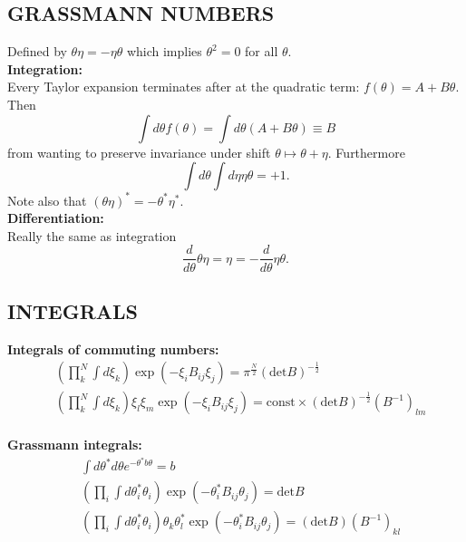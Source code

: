 \documentclass[a4paper, norsk, 8pt, landscape]{article}
\newcommand{\EQU}[1] { \begin{equation*} \begin{split}
#1
\end{split} \end{equation*} }
\begin{document}
\begin{multicols*}{3}
\subsection*{\small  GRASSMANN NUMBERS}
Defined by $\theta \eta = -\eta \theta$ which implies $\theta^2=0$ for all $\theta$. \\
 {\textbf{Integration:}}\\
Every Taylor expansion terminates after at the quadratic term: $f(\theta)=A+B\theta$. Then
\[
\int d\theta f(\theta) = \int d\theta (A+B\theta) \equiv B
\]
from wanting to preserve invariance under shift $\theta \mapsto \theta + \eta$.
Furthermore
\[
\int d\theta \int d\eta \eta \theta = +1.
\]
Note also that $(\theta \eta)^* = -\theta^* \eta^*$.
\\
 {\textbf{Differentiation:}}\\
Really the same as integration
\[
\frac{d}{d\theta}\theta \eta = \eta = -\frac{d}{d\theta}\eta\theta.
\]














\subsection*{\small  INTEGRALS}
 {\textbf{Integrals of commuting numbers:}}
\EQU{
& \left(\prod_k^N \int d\xi_k\right)\exp \left(-\xi_i B_{ij} \xi_j \right)
= \pi^{\frac{N}{2}}(\text{det} B)^{-\frac{1}{2}} \\
& \left(\prod_k^N \int d\xi_k\right)\xi_l \xi_m \exp \left(-\xi_i B_{ij} \xi_j \right)
= \text{const}\times (\text{det} B)^{-\frac{1}{2}} (B^{-1})_{lm}
}
\\
 {\textbf{Grassmann integrals:}}
\EQU{
& \int d \theta^* d\theta e^{-\theta^* b \theta} = b \\
& \left(\prod_i \int d\theta^*_i \theta_i\right) \exp \left(-\theta^*_i B_{ij}\theta_j\right)
= \text{det} B \\
& \left(\prod_i \int d\theta^*_i \theta_i\right)\theta_k \theta^*_l \exp \left(-\theta^*_i B_{ij}\theta_j\right)
= (\text{det} B)(B^{-1})_{kl} \\
}

















\end{multicols*}
\end{document}
